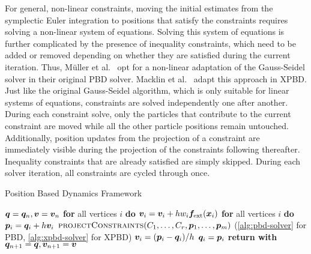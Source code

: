 For general, non-linear constraints, moving the initial estimates from the symplectic Euler integration to positions that satisfy the constraints
requires solving a non-linear system of equations. Solving this system of equations is further complicated by the presence of inequality constraints, which
need to be added or removed depending on whether they are satisfied during the current iteration. Thus, Müller et al.\ \cite{mueller2006} opt for a 
non-linear adaptation of the Gauss-Seidel solver in their original PBD solver. Macklin et al.\ \cite{macklin2016} adapt this approach in XPBD. 
Just like the original Gauss-Seidel algorithm, which is only suitable for linear systems of equations, 
constraints are solved independently one after another. During each constraint solve, only the particles that contribute to the current constraint are
moved while all the other particle positions remain untouched. Additionally, position updates from the projection of a constraint are immediately 
visible during the projection of the constraints following thereafter. Inequality constraints that are already satisfied are simply skipped. 
During each solver iteration, all constraints are cycled through once.

\begin{algorithm}
\caption{Position Based Dynamics Framework}\label{alg:pbd}
\begin{algorithmic}[1]
\State $\bm{q} = \bm{q}_n, \bm{v} = \bm{v}_n$
\State \textbf{for} all vertices $i$ \textbf{do} $\bm{v}_i = \bm{v}_i + hw_i\bm{f}_{\text{ext}}(\bm{x}_i)$
\State \textbf{for} all vertices $i$ \textbf{do} $\bm{p}_i = \bm{q}_i + h\bm{v}_i$
\State $\textsc{projectConstraints}(C_1, \ldots, C_r, \bm{p}_1, \ldots, \bm{p}_m)$ (\cref{alg:pbd-solver} for PBD, 
\StatexIndent[2] \cref{alg:xpbd-solver} for XPBD)
\State $\bm{v}_i = (\bm{p}_i - \bm{q}_i) / h$
\State $\bm{q}_i = \bm{p}_i$
\EndFor
\State \textbf{return with } $\bm{q}_{n+1} = \bm{q}, \bm{v}_{n+1} = \bm{v}$
\EndProcedure
\end{algorithmic}
\end{algorithm}

